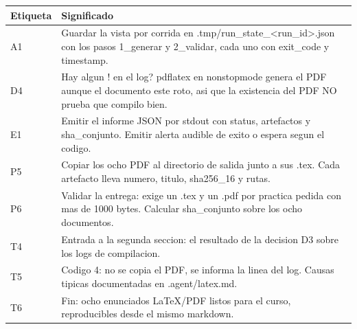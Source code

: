 \documentclass[11pt,a4paper]{article}
\begin{document}
\begin{center}
\end{center}

\vspace{6pt}
\begin{tcolorbox}[cajaContenido, title={\faIcon{table}~Leyenda de etiquetas}]
\small
\begin{tabularx}{\linewidth}{@{}>{\centering\arraybackslash}p{1.4cm}X@{}}
\toprule
\textbf{Etiqueta} & \textbf{Significado} \\ \midrule
A1 & Guardar la vista por corrida en .tmp/run\_state\_<run\_id>.json con los pasos 1\_generar y 2\_validar, cada uno con exit\_code y timestamp. \\
D4 & Hay algun ! en el log? pdflatex en nonstopmode genera el PDF aunque el documento este roto, asi que la existencia del PDF NO prueba que compilo bien. \\
E1 & Emitir el informe JSON por stdout con status, artefactos y sha\_conjunto. Emitir alerta audible de exito o espera segun el codigo. \\
P5 & Copiar los ocho PDF al directorio de salida junto a sus .tex. Cada artefacto lleva numero, titulo, sha256\_16 y rutas. \\
P6 & Validar la entrega: exige un .tex y un .pdf por practica pedida con mas de 1000 bytes. Calcular sha\_conjunto sobre los ocho documentos. \\
T4 & Entrada a la segunda seccion: el resultado de la decision D3 sobre los logs de compilacion. \\
T5 &  Codigo 4: no se copia el PDF, se informa la linea del log. Causas tipicas documentadas en .agent/latex.md. \\
T6 & Fin: ocho enunciados LaTeX/PDF listos para el curso, reproducibles desde el mismo markdown. \\
\bottomrule
\end{tabularx}
\end{tcolorbox}
\end{document}
